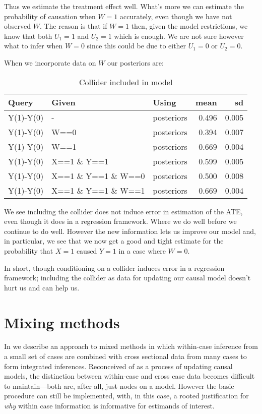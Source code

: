 \documentclass[
  12pt,
]{book}
\begin{document}
Thus we estimate the treatment effect well. What's more we can estimate the probability of causation when \(W=1\) accurately, even though we have not observed \(W\). The reason is that if \(W=1\) then, given the model restrictions, we know that both \(U_1=1\) and \(U_2=1\) which is enough. We are not sure however what to infer when \(W=0\) since this could be due to either \(U_1=0\) or \(U_2=0\).

When we incorporate data on \(W\) our posteriors are:

\begin{table}

\caption{\label{tab:applearncoll8}Collider included in model}
\centering
\begin{tabular}[t]{l|l|l|r|r}
\hline
Query & Given & Using & mean & sd\\
\hline
Y(1)-Y(0) & - & posteriors & 0.496 & 0.005\\
\hline
Y(1)-Y(0) & W==0 & posteriors & 0.394 & 0.007\\
\hline
Y(1)-Y(0) & W==1 & posteriors & 0.669 & 0.004\\
\hline
Y(1)-Y(0) & X==1 \& Y==1 & posteriors & 0.599 & 0.005\\
\hline
Y(1)-Y(0) & X==1 \& Y==1 \& W==0 & posteriors & 0.500 & 0.008\\
\hline
Y(1)-Y(0) & X==1 \& Y==1 \& W==1 & posteriors & 0.669 & 0.004\\
\hline
\end{tabular}
\end{table}

We see including the collider does not induce error in estimation of the ATE, even though it does in a regression framework. Where we do well before we continue to do well. However the new information lets us improve our model and, in particular, we see that we now get a good and tight estimate for the probability that \(X=1\) caused \(Y=1\) in a case where \(W=0\).

In short, though conditioning on a collider induces error in a regression framework; including the collider as data for updating our causal model doesn't hurt us and can help us.

\hypertarget{mixing-methods}{%
\chapter{Mixing methods}\label{mixing-methods}}

In \citet{humphreys2015mixing} we describe an approach to mixed methods in which within-case inference from a small set of cases are combined with cross sectional data from many cases to form integrated inferences. Reconceived of as a process of updating causal models, the distinction between within-case and cross case data becomes difficult to maintain---both are, after all, just nodes on a model. However the basic procedure can still be implemented, with, in this case, a rooted justification for \emph{why} within case information is informative for estimands of interest.
\end{document}
